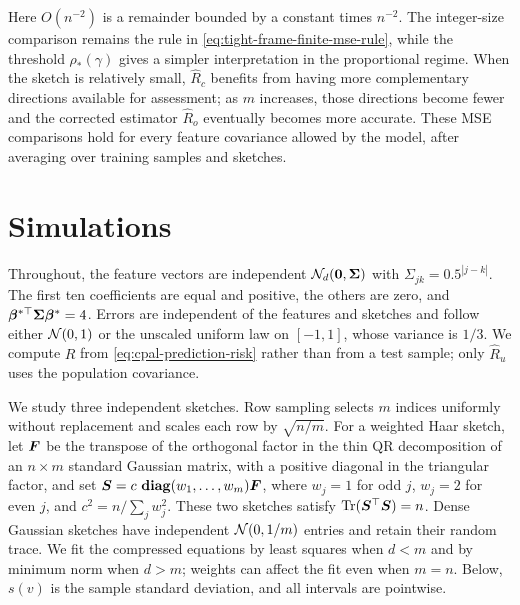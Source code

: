 \documentclass{article}
\theoremstyle{plain} %
\theoremstyle{definition} %
\theoremstyle{definition} %
\newcommand{\hR}{\hat{R}}
\begin{document}
Here $O(n^{-2})$ is a remainder bounded by a constant times $n^{-2}$. The integer-size comparison remains the rule in \eqref{eq:tight-frame-finite-mse-rule}, while the threshold $\rho_*(\gamma)$ gives a simpler interpretation in the proportional regime. When the sketch is relatively small, $\widehat R_c$ benefits from having more complementary directions available for assessment; as $m$ increases, those directions become fewer and the corrected estimator $\hR_o$ eventually becomes more accurate. These MSE comparisons hold for every feature covariance allowed by the model, after averaging over training samples and sketches.


\section{Simulations}
\label{sec:simulations}

Throughout, the feature vectors are independent
${\mathcal N}_d(\mathbf{0},\boldsymbol{\Sigma})$ with $\Sigma_{jk}=0.5^{|j-k|}$. The first
ten coefficients are equal and positive, the others are zero, and
$\boldsymbol{\beta}^{*\top}\boldsymbol{\Sigma}\boldsymbol{\beta}^*=4$. Errors are independent of the features
and sketches and follow either ${\mathcal N}(0,1)$ or the unscaled uniform law on
$[-1,1]$, whose variance is $1/3$. We compute $R$ from
\eqref{eq:cpal-prediction-risk} rather than from a test sample; only
$\hR_u$ uses the population covariance.

We study three independent sketches. Row sampling selects $m$ indices
uniformly without replacement and scales each row by $\sqrt{n/m}$. For a
weighted Haar sketch, let $\boldsymbol{F}$ be the transpose of the orthogonal factor
in the thin QR decomposition of an $n\times m$ standard Gaussian matrix,
with a positive diagonal in the triangular factor, and set
$\boldsymbol{S}=c\,\operatorname{\mathbf{diag}}(w_1,\ldots,w_m)\boldsymbol{F}$, where $w_j=1$ for odd $j$, $w_j=2$
for even $j$, and $c^2=n/\sum_jw_j^2$. These two sketches satisfy
$\operatorname{Tr}(\boldsymbol{S}^\top\boldsymbol{S})=n$. Dense Gaussian sketches have independent
${\mathcal N}(0,1/m)$ entries and retain their random trace. We fit the compressed
equations by least squares when $d<m$ and by minimum norm when $d>m$;
weights can affect the fit even when $m=n$. Below, $s(v)$ is the sample
standard deviation, and all intervals are pointwise.
\end{document}
